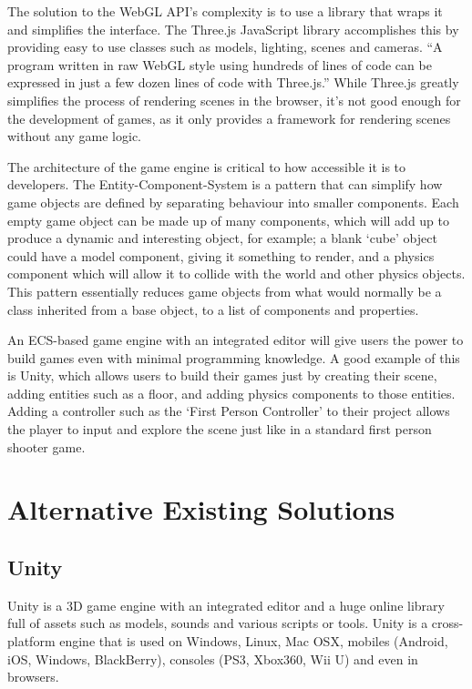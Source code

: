 The solution to the WebGL API's complexity is to use a library that wraps it and simplifies the interface. The Three.js\cite{threejs} JavaScript library accomplishes this by providing easy to use classes such as models, lighting, scenes and cameras. ``A program written in raw WebGL style using hundreds of lines of code can be expressed in just a few dozen lines of code with Three.js.''\cite[p57]{parisi2014programming} While Three.js greatly simplifies the process of rendering scenes in the browser, it's not good enough for the development of games, as it only provides a framework for rendering scenes without any game logic.

The architecture of the game engine is critical to how accessible it is to developers. The Entity-Component-System is a pattern that can simplify how game objects are defined by separating behaviour into smaller components. Each empty game object can be made up of many components, which will add up to produce a dynamic and interesting object, for example; a blank `cube' object could have a model component, giving it something to render, and a physics component which will allow it to collide with the world and other physics objects.\cite{gregory2014game} This pattern essentially reduces game objects from what would normally be a class inherited from a base object, to a list of components and properties.

An ECS-based game engine with an integrated editor will give users the power to build games even with minimal programming knowledge. A good example of this is Unity, which allows users to build their games just by creating their scene, adding entities such as a floor, and adding physics components to those entities.\cite{unitycreatingscenes} Adding a controller such as the `First Person Controller' to their project allows the player to input and explore the scene just like in a standard first person shooter game.\cite{unitycharactercontrol}

\section{Alternative Existing Solutions}
\subsection{Unity}
Unity is a 3D game engine with an integrated editor and a huge online library full of assets such as models, sounds and various scripts or tools. Unity is a cross-platform engine that is used on Windows, Linux, Mac OSX, mobiles (Android, iOS, Windows, BlackBerry), consoles (PS3, Xbox360, Wii U) and even in browsers.\cite{unity}

